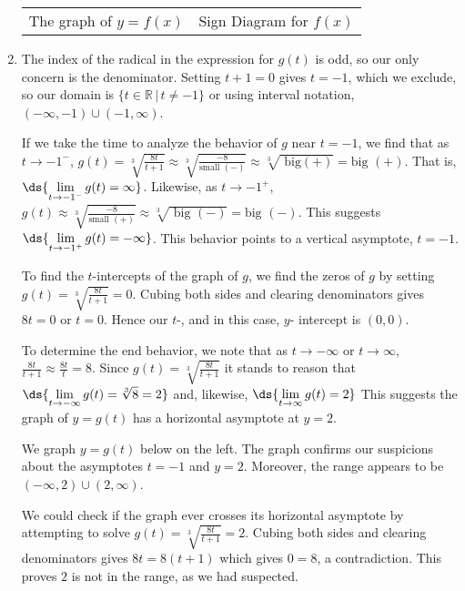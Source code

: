 \documentclass{ximera}
\begin{document}
\begin{example}
\begin{enumerate}
\begin{center}
\begin{tabular}{cc}
The graph of $y=f(x)$  \hspace{0.75in} & Sign Diagram for $f(x)$ \\


\end{tabular}
\end{center} 


\item  The index of the radical  in the expression for $g(t)$ is odd, so our only concern is the denominator.  Setting $t+1=0$ gives $t=-1$, which we exclude, so our domain is $\{ t \in \mathbb{R} \, | \, t \neq -1\}$ or using interval notation, $(-\infty, -1) \cup (-1, \infty)$.    

If we take the time to analyze the behavior of $g$ near $t=-1$, we find that as $t \rightarrow -1^{-}$, $g(t) = \sqrt[3]{\frac{8t}{t+1}}  \approx \sqrt[3]{\frac{-8}{\text{small $(-)$}}}  \approx \sqrt[3]{\text{ big$(+)$}} = \text{big $(+)$}$.  That is, $\ds{\lim_{t \rightarrow -1^{-}} g(t) = \infty}$.  Likewise, as $t \rightarrow -1^{+}$, $g(t)  \approx \sqrt[3]{\frac{-8}{\text{small $(+)$}}}  \approx \sqrt[3]{\text{ big $(-)$}} = \text{big $(-)$}$.  This suggests  $\ds{\lim_{t \rightarrow -1^{+}} g(t) = -\infty}$.  This behavior points to a vertical asymptote, $t=-1$.

To find the $t$-intercepts of the graph of $g$, we find the zeros of $g$ by setting $g(t) = \sqrt[3]{\frac{8t}{t+1}} = 0$.  Cubing both sides and clearing denominators  gives $8t = 0$ or $t = 0$.  Hence our  $t$-, and in this case,  $y$- intercept is $(0,0)$.

To determine the end behavior, we note that as $t \rightarrow  -\infty$ or $t \rightarrow  \infty$,  $\frac{8t}{t+1} \approx \frac{8t}{t} = 8$.  Since  $g(t) = \sqrt[3]{\frac{8t}{t+1}}$  it stands to reason that $\ds{\lim_{ t \rightarrow -\infty} g(t) =  \sqrt[3]{8} = 2}$ and, likewise, $\ds{\lim_{ t \rightarrow \infty} g(t) = 2}$  This suggests the graph of $y = g(t)$ has a horizontal asymptote at $y = 2$.

We graph $y = g(t)$ below on the left. The graph confirms our suspicions about the asymptotes $t = -1$ and $y = 2$.  Moreover, the range appears to be $(-\infty, 2) \cup (2, \infty)$.  

We could check if the graph ever crosses its horizontal asymptote by attempting to solve $g(t) =  \sqrt[3]{\frac{8t}{t+1}} = 2$.  Cubing both sides and clearing denominators gives $8t = 8(t+1)$ which gives $0 = 8$, a contradiction.  This proves $2$ is not in the range, as we had suspected. 


\end{enumerate}
\end{example}
\end{document}
